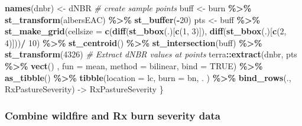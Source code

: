 \documentclass[
]{article}
\newenvironment{Shaded}{\begin{snugshade}}{\end{snugshade}}
\newcommand{\AttributeTok}[1]{\textcolor[rgb]{0.13,0.29,0.53}{#1}}
\newcommand{\CommentTok}[1]{\textcolor[rgb]{0.56,0.35,0.01}{\textit{#1}}}
\newcommand{\ConstantTok}[1]{\textcolor[rgb]{0.56,0.35,0.01}{#1}}
\newcommand{\DecValTok}[1]{\textcolor[rgb]{0.00,0.00,0.81}{#1}}
\newcommand{\FunctionTok}[1]{\textcolor[rgb]{0.13,0.29,0.53}{\textbf{#1}}}
\newcommand{\NormalTok}[1]{#1}
\newcommand{\OtherTok}[1]{\textcolor[rgb]{0.56,0.35,0.01}{#1}}
\newcommand{\SpecialCharTok}[1]{\textcolor[rgb]{0.81,0.36,0.00}{\textbf{#1}}}
\newcommand{\StringTok}[1]{\textcolor[rgb]{0.31,0.60,0.02}{#1}}
\begin{document}
\begin{Shaded}
\begin{Highlighting}[]
      \FunctionTok{names}\NormalTok{(dnbr) }\OtherTok{\textless{}{-}} \StringTok{\textquotesingle{}dNBR\textquotesingle{}}
    \CommentTok{\# create sample points }
\NormalTok{      buff }\OtherTok{\textless{}{-}}\NormalTok{ burn }\SpecialCharTok{\%\textgreater{}\%} 
                \FunctionTok{st\_transform}\NormalTok{(albersEAC) }\SpecialCharTok{\%\textgreater{}\%} 
                \FunctionTok{st\_buffer}\NormalTok{(}\SpecialCharTok{{-}}\DecValTok{20}\NormalTok{)}
\NormalTok{      pts }\OtherTok{\textless{}{-}}\NormalTok{  buff }\SpecialCharTok{\%\textgreater{}\%}
                \FunctionTok{st\_make\_grid}\NormalTok{(}\AttributeTok{cellsize =} \FunctionTok{c}\NormalTok{(}\FunctionTok{diff}\NormalTok{(}\FunctionTok{st\_bbox}\NormalTok{(.)[}\FunctionTok{c}\NormalTok{(}\DecValTok{1}\NormalTok{, }\DecValTok{3}\NormalTok{)]), }
                                          \FunctionTok{diff}\NormalTok{(}\FunctionTok{st\_bbox}\NormalTok{(.)[}\FunctionTok{c}\NormalTok{(}\DecValTok{2}\NormalTok{, }\DecValTok{4}\NormalTok{)]))}\SpecialCharTok{/} \DecValTok{10}\NormalTok{) }\SpecialCharTok{\%\textgreater{}\%} 
                \FunctionTok{st\_centroid}\NormalTok{() }\SpecialCharTok{\%\textgreater{}\%}
                \FunctionTok{st\_intersection}\NormalTok{(buff) }\SpecialCharTok{\%\textgreater{}\%}
                \FunctionTok{st\_transform}\NormalTok{(}\DecValTok{4326}\NormalTok{)}
    \CommentTok{\# Extract dNBR values at points}
\NormalTok{      terra}\SpecialCharTok{::}\FunctionTok{extract}\NormalTok{(dnbr,}
\NormalTok{                     pts }\SpecialCharTok{\%\textgreater{}\%}
                       \FunctionTok{vect}\NormalTok{() , }
                     \AttributeTok{fun =}\NormalTok{ mean, }
                     \AttributeTok{method =} \StringTok{\textquotesingle{}bilinear\textquotesingle{}}\NormalTok{,}
                     \AttributeTok{bind =} \ConstantTok{TRUE}\NormalTok{)  }\SpecialCharTok{\%\textgreater{}\%} 
      \FunctionTok{as\_tibble}\NormalTok{() }\SpecialCharTok{\%\textgreater{}\%}
      \FunctionTok{tibble}\NormalTok{(}\AttributeTok{location =}\NormalTok{ lc, }
             \AttributeTok{burn =}\NormalTok{ bn, }
\NormalTok{             . ) }\SpecialCharTok{\%\textgreater{}\%} 
      \FunctionTok{bind\_rows}\NormalTok{(., RxPastureSeverity) }\OtherTok{{-}\textgreater{}}\NormalTok{ RxPastureSeverity}
\NormalTok{\}}
\end{Highlighting}
\end{Shaded}

\subsubsection{Combine wildfire and Rx burn severity
data}\label{combine-wildfire-and-rx-burn-severity-data}
\end{document}
